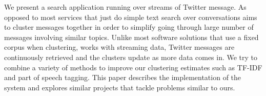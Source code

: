 
We present {\project}  a search application running over streams of Twitter message. As opposed to most services that just do simple text search over conversations {\project}  aims to cluster messages together in order to simplify going through large number of messages involving similar topics. Unlike most software solutions that use a fixed corpus when clustering, {\project}  works with streaming data, Twitter messages are continuously retrieved and the clusters update as more data comes in. We try to combine a variety of methods to improve our clustering estimates such as TF-IDF and part of speech tagging. This paper describes the implementation of the system and explores similar projects that tackle problems similar to ours.
